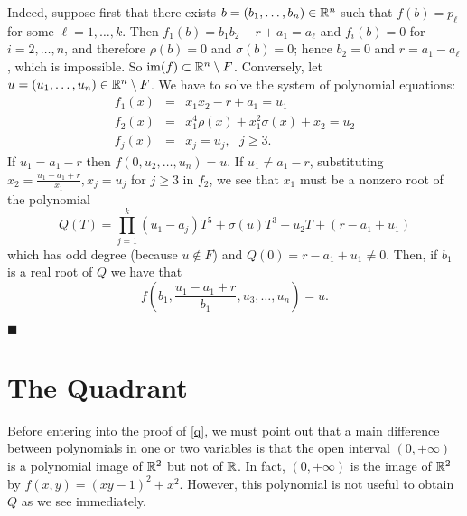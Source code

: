 \documentclass[11pt,draft]{article}
\newenvironment{prooffp}%
	{\par\noindent{\it Proof of Theorem
\ref{fp}.}\nopagebreak\normalsize}%
	{\hfill\linebreak[2]\hspace*{\fill}$\blacksquare$\\[5pt]}
\newcommand{\im}{\operatorname{im}}
\begin{document}
\begin{prooffp}
Indeed, suppose first that there exists $b=(b_{1},\ldots,b_{n})\in{\mathbb R}^n$ such that 
$f(b)=p_\ell$ for some $\ell=1,\ldots,k$. Then $f_1(b)=b_1b_2-r+a_1=a_\ell$ and $f_i(b)=0$
for $i=2,\ldots,n$, and therefore $\rho(b)=0$ and $\sigma(b)=0$; hence $b_2=0$ and
$r=a_1-a_\ell$, which is impossible. So $\im(f)\subset \R^n\setminus F$. Conversely, let
$u=(u_1,\ldots,u_n)\in{\mathbb R}^n\setminus F$. We have to solve the system of polynomial equations:
$$
\begin{array}{rcl}
f_1(x)&=&x_1x_2-r+a_1=u_1\\
f_2(x)&=&x_1^{4}\rho(x)+x_1^{2}\sigma(x)+x_2=u_2\\
f_j(x)&=&x_j=u_j,\ \ \ j\geq 3.
\end{array}
$$
If $u_1=a_1-r$ then $f(0,u_2,\ldots,u_n)=u$. If $u_1\neq a_1-r$, substituting 
$x_2=\frac{u_1-a_1+r}{x_1},x_j=u_j$ for $j\geq 3$ in $f_2$, we  see that $x_1$ must be a
nonzero root of the polynomial
$$
Q(T)=\prod_{j=1}^k(u_1-a_j)T^{5}+\sigma(u)T^{3}-u_2T+(r-a_1+u_1)
$$
which has odd degree (because $u\not\in F$) and $Q(0)=r-a_1+u_1\neq 0$. Then, if 
$b_1$ is a real root of $Q$ we have that
$$
f\left(b_1,\frac{u_1-a_1+r}{b_1},u_3,\ldots,u_n\right)=u.
$$


\end{prooffp}

\section{The Quadrant}

Before entering into the proof of \ref{q}, we must point out that a main difference between
polynomials in one or two variables is that the open interval $(0,+\infty)$ is a polynomial
image of ${\mathbb R}^2$ but not of ${\mathbb R}$. In fact, $(0,+\infty)$ is the image of
${\mathbb R}^2$ by $f(x,y)=(xy-1)^2+x^2$. However, this polynomial is not useful to obtain
$Q$ as we see immediately.
\end{document}
